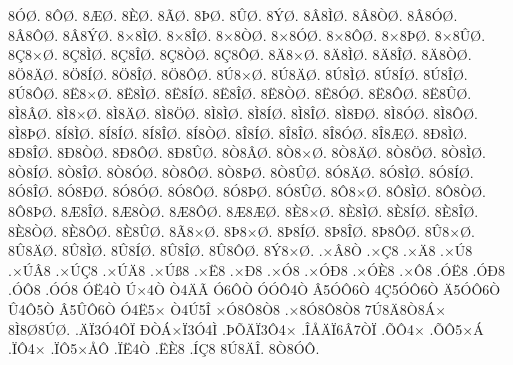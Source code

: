 {8^^d3^^d8.
8^^d4^^d8.
8^^c6^^d8.
8^^c8^^d8.
8^^c3^^d8.
8^^de^^d8.
8^^db^^d8.
8^^dd^^d8.
8^^c28^^cc^^d8.
8^^c28^^d2^^d8.
8^^c28^^d3^^d8.
8^^c28^^d4^^d8.
8^^c28^^dd^^d8.
8^^d78^^cc^^d8.
8^^d78^^ce^^d8.
8^^d78^^d2^^d8.
8^^d78^^d3^^d8.
8^^d78^^d4^^d8.
8^^d78^^de^^d8.
8^^d78^^db^^d8.
8^^c78^^d7^^d8.
8^^c78^^cc^^d8.
8^^c78^^ce^^d8.
8^^c78^^d2^^d8.
8^^c78^^d4^^d8.
8^^c48^^d7^^d8.
8^^c48^^cc^^d8.
8^^c48^^ce^^d8.
8^^c48^^d2^^d8.
8^^d68^^c4^^d8.
8^^d68^^cd^^d8.
8^^d68^^ce^^d8.
8^^d68^^d4^^d8.
8^^da8^^d7^^d8.
8^^da8^^c4^^d8.
8^^da8^^cc^^d8.
8^^da8^^cd^^d8.
8^^da8^^ce^^d8.
8^^da8^^d4^^d8.
8^^cb8^^d7^^d8.
8^^cb8^^cc^^d8.
8^^cb8^^cd^^d8.
8^^cb8^^ce^^d8.
8^^cb8^^d2^^d8.
8^^cb8^^d3^^d8.
8^^cb8^^d4^^d8.
8^^cb8^^db^^d8.
8^^cc8^^c2^^d8.
8^^cc8^^d7^^d8.
8^^cc8^^c4^^d8.
8^^cc8^^d6^^d8.
8^^cc8^^cc^^d8.
8^^cc8^^cd^^d8.
8^^cc8^^ce^^d8.
8^^cc8^^d0^^d8.
8^^cc8^^d3^^d8.
8^^cc8^^d4^^d8.
8^^cc8^^de^^d8.
8^^cd8^^cc^^d8.
8^^cd8^^cd^^d8.
8^^cd8^^ce^^d8.
8^^cd8^^d2^^d8.
8^^ce8^^cd^^d8.
8^^ce8^^ce^^d8.
8^^ce8^^d3^^d8.
8^^ce8^^c6^^d8.
8^^d08^^cc^^d8.
8^^d08^^ce^^d8.
8^^d08^^d2^^d8.
8^^d08^^d4^^d8.
8^^d08^^db^^d8.
8^^d28^^c2^^d8.
8^^d28^^d7^^d8.
8^^d28^^c4^^d8.
8^^d28^^d6^^d8.
8^^d28^^cc^^d8.
8^^d28^^cd^^d8.
8^^d28^^ce^^d8.
8^^d28^^d3^^d8.
8^^d28^^d4^^d8.
8^^d28^^de^^d8.
8^^d28^^db^^d8.
8^^d38^^c4^^d8.
8^^d38^^cc^^d8.
8^^d38^^cd^^d8.
8^^d38^^ce^^d8.
8^^d38^^d0^^d8.
8^^d38^^d3^^d8.
8^^d38^^d4^^d8.
8^^d38^^de^^d8.
8^^d38^^db^^d8.
8^^d48^^d7^^d8.
8^^d48^^cc^^d8.
8^^d48^^d2^^d8.
8^^d48^^de^^d8.
8^^c68^^ce^^d8.
8^^c68^^d2^^d8.
8^^c68^^d4^^d8.
8^^c68^^c6^^d8.
8^^c88^^d7^^d8.
8^^c88^^cc^^d8.
8^^c88^^cd^^d8.
8^^c88^^ce^^d8.
8^^c88^^d2^^d8.
8^^c88^^d4^^d8.
8^^c88^^db^^d8.
8^^c38^^d7^^d8.
8^^de8^^d7^^d8.
8^^de8^^cd^^d8.
8^^de8^^ce^^d8.
8^^de8^^d4^^d8.
8^^db8^^d7^^d8.
8^^db8^^c4^^d8.
8^^db8^^cc^^d8.
8^^db8^^cd^^d8.
8^^db8^^ce^^d8.
8^^db8^^d4^^d8.
8^^dd8^^d7^^d8.
.^^d7^^c28^^d2
.^^d7^^c78
.^^d7^^c48
.^^d7^^da8
.^^d7^^da^^c28
.^^d7^^da^^c78
.^^d7^^da^^c48
.^^d7^^da^^df8
.^^d7^^cb8
.^^d7^^d08
.^^d7^^d38
.^^d7^^d3^^d08
.^^d7^^d3^^c88
.^^d7^^d48
.^^d3^^cb8
.^^d3^^d08
.^^d3^^d48
.^^d3^^d38
^^d3^^cb4^^d2
^^da^^d74^^d2
^^d24^^c4^^c3
^^d36^^d4^^d2
^^d3^^d3^^d44^^d2
^^c25^^d3^^d46^^d2
4^^c75^^d3^^d46^^d2
^^c45^^d3^^d46^^d2
^^db4^^d45^^d2
^^c25^^db^^d46^^d2
^^d34^^cb5^^d7
^^d24^^da5^^ce
^^d7^^d38^^d48^^d28
.^^d78^^d38^^d48^^d28
7^^da8^^c48^^d28^^c1^^d7
8^^cc8^^d88^^da^^d8.
.^^c4^^cf3^^d34^^d4^^cf
^^d0^^d2^^c1^^d7^^cf3^^d34^^cc
.^^de^^d5^^c4^^cf3^^d44^^d7
.^^ce^^c5^^c4^^cf6^^c27^^d2^^cf
.^^d5^^d44^^d7
.^^d5^^d45^^d7^^c1
.^^cf^^d44^^d7
.^^cf^^d45^^d7^^c5^^d4
.^^cf^^cb4^^d2
.^^cb^^c88
.^^cd^^c78
8^^da8^^c4^^ce.
8^^d28^^d3^^d4.
}
